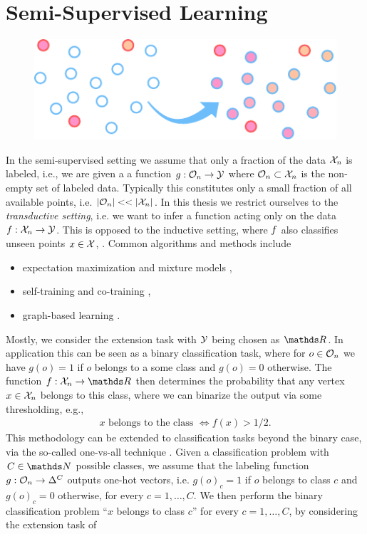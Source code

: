 \section{Semi-Supervised Learning}\label{sec:PSSL}
\begin{figure}
\centering
\includegraphics[width=.5\textwidth]{atelier/paradigms/SSL.pdf}
\end{figure}
%
In the semi-supervised setting we assume that only a fraction of the data $\mathcal{X}_n$ is labeled, i.e., we are given a a function $g:\mathcal{O}_n\to\mathcal{\mathcal{Y}}$ where $\mathcal{O}_n\subset\mathcal{X}_n$ is the non-empty set of labeled data. Typically this constitutes only a small fraction of all available points, i.e. $\left|\mathcal{O}_n\right|<<\left|\mathcal{X}_n\right|$. In this thesis we restrict ourselves to the \emph{transductive setting}, i.e. we want to infer a function acting only on the data $f: \mathcal{X}_n\to \mathcal{\mathcal{Y}}$. This is opposed to the inductive setting, where $f$ also classifies unseen points $x\in\mathcal{X}$, \cite{zhu2005semi}. Common algorithms and methods include
%
\begin{itemize}
\item expectation maximization and mixture models \cite{dempster1977maximum,cozman2003semi},
\item self-training and co-training \cite{blum1998combining},
\item graph-based learning \cite{zhu2005semi}.
\end{itemize}
%
%
Mostly, we consider the extension task with $\mathcal{\mathcal{Y}}$ being chosen as $\R$. In application this can be seen as a binary classification task, where for $o\in\mathcal{O}_n$ we have $g(o)=1$ if $o$ belongs to a some class and $g(o)=0$ otherwise. The function $f:\Inp_n\to\R$ then determines the probability that any vertex $x\in \mathcal{X}_n$ belongs to this class, where we can binarize the output via some thresholding, e.g.,
%
\begin{align*}
x \text{ belongs to the class } \Leftrightarrow f(x) > 1/2.	
\end{align*}
%
This methodology can be extended to classification tasks beyond the binary case, via the so-called one-vs-all technique \cite{zhu2003semi}. Given a classification problem with $C\in\N$ possible classes, we assume that the labeling function $g:\mathcal{O}_n\to \Delta^C$ outputs one-hot vectors, i.e. $g(o)_c =1$ if $o$ belongs to class $c$ and $g(o)_c=0$ otherwise, for every $c = 1,\ldots, C$. We then perform the binary classification problem \enquote{$x$ belongs to class $c$} for every $c=1,\ldots,C$, by considering the extension task of 

